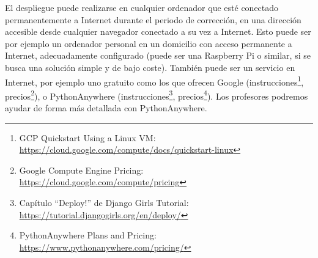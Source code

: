 \begin{itemize}
  El despliegue puede realizarse en cualquier ordenador que esté conectado permanentemente a Internet durante el periodo de corrección, en una dirección accesible desde cualquier navegador conectado a su vez a Internet. Esto puede ser por ejemplo un ordenador personal en un domicilio con acceso permanente a Internet, adecuadamente configurado (puede ser una Raspberry Pi o similar, si se busca una solución simple y de bajo coste). También puede ser un servicio en Internet, por ejemplo uno gratuito como los que ofrecen Google (instrucciones\footnote{GCP Quickstart Using a Linux VM:\\ \url{https://cloud.google.com/compute/docs/quickstart-linux}}, precios\footnote{Google Compute Engine Pricing:\\ \url{https://cloud.google.com/compute/pricing}}), o PythonAnywhere (instrucciones\footnote{Capítulo ``Deploy!'' de Django Girls Tutorial:\\ \url{https://tutorial.djangogirls.org/en/deploy/}}, precios\footnote{PythonAnywhere Plans and Pricing:\\ \url{https://www.pythonanywhere.com/pricing/}}). Los profesores podremos ayudar de forma más detallada con PythonAnywhere.

\end{itemize}
